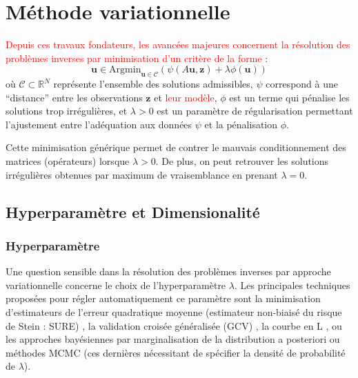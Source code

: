 \documentclass[a4paper, 12pt]{report} %
\begin{document}
\section{Méthode variationnelle}
\textcolor{red}{Depuis ces travaux fondateurs, les avancées majeures concernent la résolution des problèmes inverses par minimisation d’un critère de la forme} :
\[
\mathbf{u} \in \text{Argmin}_{\mathbf{u} \in \mathcal{C}} \left( \psi(A\mathbf{u}, \mathbf{z}) + \lambda \phi(\mathbf{u}) \right) \tag{2}
\]
où \( \mathcal{C} \subset \mathbb{R}^N \) représente l’ensemble des solutions admissibles, \( \psi \) correspond à une “distance” entre les observations \( \mathbf{z} \) et \textcolor{red}{leur modèle}, \( \phi \) est un terme qui pénalise les solutions trop irrégulières, et \( \lambda > 0 \) est un paramètre de régularisation permettant l’ajustement entre l’adéquation aux données \( \psi \) et la pénalisation \( \phi \).

Cette minimisation générique permet de contrer le mauvais conditionnement des matrices (opérateurs) lorsque \( \lambda > 0 \). De plus, on peut retrouver les solutions irrégulières obtenues par maximum de vraisemblance en prenant \( \lambda = 0 \).

\subsection{Hyperparamètre et Dimensionalité}

\subsubsection{Hyperparamètre}
Une question sensible dans la résolution des problèmes inverses par approche variationnelle concerne le choix de l’hyperparamètre \( \lambda \). Les principales techniques proposées pour régler automatiquement ce paramètre sont la minimisation d’estimateurs de l’erreur quadratique moyenne 
(estimateur non-biaisé du risque de Stein : SURE) \cite{deledalle2014stein}, la validation croisée généralisée (GCV) \cite{golub1979generalized}, la courbe en L \cite{hansen1998rank}, ou les approches bayésiennes par marginalisation de la distribution a posteriori ou méthodes MCMC (ces dernières nécessitant de spécifier la densité de probabilité de \( \lambda \)).
\end{document}
